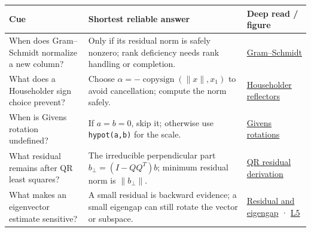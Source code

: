 {\def\LTcaptype{none} %
\begin{longtable}[]{@{}
  >{\raggedright\arraybackslash}p{}
  >{\raggedright\arraybackslash}p{}
  >{\raggedright\arraybackslash}p{}@{}}
\toprule\noalign{}
\begin{minipage}[b]{\linewidth}\raggedright
Cue
\end{minipage} & \begin{minipage}[b]{\linewidth}\raggedright
Shortest reliable answer
\end{minipage} & \begin{minipage}[b]{\linewidth}\raggedright
Deep read / figure
\end{minipage} \\
\midrule\noalign{}
\endhead
\bottomrule\noalign{}
\endlastfoot
When does Gram--Schmidt normalize a new column? & Only if its residual norm is safely nonzero; rank deficiency needs rank handling or completion. & \href{Continuous\%20Notes/Computing\%20Foundations\%20-\%20From\%20Bits\%20to\%20C++\%20and\%20Systems\%20APIs\#Orthogonal\%20coordinates\%20preserve\%20the\%20shape\%20of\%20the\%20problem/}{Gram--Schmidt} \\
What does a Householder sign choice prevent? & Choose \(\alpha=-\operatorname{copysign}(\|x\|,x_1)\) to avoid cancellation; compute the norm safely. & \href{Continuous\%20Notes/Computing\%20Foundations\%20-\%20From\%20Bits\%20to\%20C++\%20and\%20Systems\%20APIs\#Reflections\%20and\%20plane\%20rotations\%20build\%20QR\%20without\%20losing\%20lengths/}{Householder reflectors} \\
When is Givens rotation undefined? & If \(a=b=0\), skip it; otherwise use \texttt{hypot(a,b)} for the scale. & \href{Continuous\%20Notes/Computing\%20Foundations\%20-\%20From\%20Bits\%20to\%20C++\%20and\%20Systems\%20APIs\#Reflections\%20and\%20plane\%20rotations\%20build\%20QR\%20without\%20losing\%20lengths/}{Givens rotations} \\
What residual remains after QR least squares? & The irreducible perpendicular part \(b_\perp=(I-QQ^T)b\); minimum residual norm is \(\|b_\perp\|\). & \href{Continuous\%20Notes/Computing\%20Foundations\%20-\%20From\%20Bits\%20to\%20C++\%20and\%20Systems\%20APIs\#QR\%20turns\%20least\%20squares\%20into\%20a\%20triangular\%20solve\%20plus\%20an\%20irreducible\%20residual/}{QR residual derivation} \\
What makes an eigenvector estimate sensitive? & A small residual is backward evidence; a small eigengap can still rotate the vector or subspace. & \href{Continuous\%20Notes/Computing\%20Foundations\%20-\%20From\%20Bits\%20to\%20C++\%20and\%20Systems\%20APIs\#Residuals\%20distinguish\%20backward\%20accuracy\%20from\%20forward\%20certainty/}{Residual and eigengap} · \href{Continuous\%20Notes/Computing\%20Foundations\%20-\%20From\%20Bits\%20to\%20C++\%20and\%20Systems\%20APIs\#Figure\%20L5\%20-\%20Eigenanalysis\%20is\%20cleanest\%20when\%20the\%20basis\%20is\%20orthonormal/}{L5} \\

\end{longtable}}
